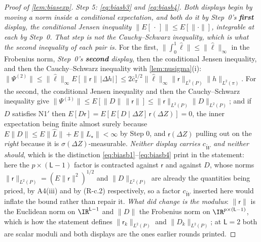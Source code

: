 \begin{proof}[Proof of \cref{lem:biasexp}]
\emph{Step 5: \eqref{eq:biasb3} and \eqref{eq:biasb4}. Both displays begin by moving a norm inside a
conditional expectation, and both do it by Step~0's \textbf{first} display, the conditional Jensen
inequality $\|E[\,\cdot\,]\|\le E[\|\cdot\|]$, integrable at each by Step~0. That step is not the
Cauchy--Schwarz inequality,
which is what the \emph{second} inequality of each pair is.} For the first, $\|\int_0^1\hat\ell\|\le\|\hat\ell\|_\infty$
in the Frobenius norm, \emph{Step~0's \textbf{second} display}, then the
conditional Jensen inequality, and then the Cauchy--Schwarz inequality with \cref{lem:nusigma}(i):
$\|\Psi^{(2)}\|\le\|\hat\ell\|_\infty E[\|\mathsf r\|\,|\Delta h|]\le2\bar c_\pi^{1/2}\|\hat\ell\|_\infty\|\mathsf r\|_{L^{2}(P)}\|h\|_{L^{2}(\pi)}$.
For the second, the conditional Jensen inequality and then the Cauchy--Schwarz inequality give
$\|\Psi^{(3)}\|\le E[\|D\|\,\|\mathsf r\|]\le\|\mathsf r\|_{L^{2}(P)}\|D\|_{L^{2}(P)}$;
and if $D$ satisfies N1$'$ then $E[D\mathsf r]=E[E[D\mid\Delta Z]\,\mathsf r(\Delta Z)]=0$, the inner
expectation being finite almost surely because $E\|D\|\le E\|\hat L\|+E\|L_\star\|<\infty$ by Step 0, and
$\mathsf r(\Delta Z)$ pulling out on the \emph{right} because it is $\sigma(\Delta Z)$-measurable.
\emph{Neither display carries $c_{\widetilde W}$ and neither should}, which is the distinction
\eqref{eq:biasb1}--\eqref{eq:biasb4} print in the statement: here the $p\times(\mathsf L-1)$ factor is
contracted against $\mathsf r$ and against $D$, whose norms
$\|\mathsf r\|_{L^{2}(P)}=(E\|\mathsf r\|^{2})^{1/2}$ and $\|D\|_{L^{2}(P)}$ are already the quantities
being priced, by A4(iii) and by (R-c.2) respectively, so a factor $c_{\widetilde W}$ inserted here
would inflate the bound rather than repair it. \emph{What did change is the modulus}: $\|\mathsf r\|$ is
the Euclidean norm on $\IR^{\mathsf L-1}$ and $\|D\|$ the Frobenius norm on
$\IR^{p\times(\mathsf L-1)}$, which is how the statement defines $\|\mathsf r_k\|_{L^{2}(P)}$ and
$\|D_k\|_{L^{2}(P)}$; at $\mathsf L=2$ both are scalar moduli and both displays are the ones earlier
rounds printed.
\end{proof}

